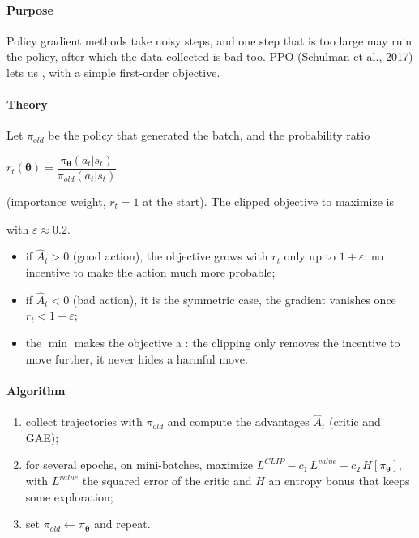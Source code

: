 \paragraph{Purpose}
Policy gradient methods take noisy steps, and one step that is too large may ruin the
policy, after which the data collected is bad too. PPO (Schulman et al., 2017) lets us
, with a simple first-order objective.

\paragraph{Theory}
Let $\pi_{old}$ be the policy that generated the batch, and the probability ratio
\begin{center}
    $r_{t}(\bm{\theta})=\dfrac{\pi_{\bm{\theta}}(a_{t}|s_{t})}{\pi_{old}(a_{t}|s_{t})}$
\end{center}
(importance weight, $r_{t}=1$ at the start). The clipped objective to maximize is
\begin{center}
    \frB{$L^{CLIP}(\bm{\theta})=\mathbb{E}_{t}\left[\min\left(r_{t}(\bm{\theta})\hat{A}_{t},\
    \mathrm{clip}\left(r_{t}(\bm{\theta}),1-\varepsilon,1+\varepsilon\right)\hat{A}_{t}
    \right)\right]$}
\end{center}
with $\varepsilon\approx0.2$.
\begin{itemize}
    \item if $\hat{A}_{t}>0$ (good action), the objective grows with $r_{t}$ only up to
        $1+\varepsilon$: no incentive to make the action much more probable;
    \item if $\hat{A}_{t}<0$ (bad action), it is the symmetric case, the gradient vanishes
        once $r_{t}<1-\varepsilon$;
    \item the $\min$ makes the objective a : the clipping only removes
        the incentive to move further, it never hides a harmful move.
\end{itemize}

\paragraph{Algorithm}
\begin{enumerate}
    \item collect trajectories with $\pi_{old}$ and compute the advantages $\hat{A}_{t}$
        (critic and GAE);
    \item for several epochs, on mini-batches, maximize
        $L^{CLIP}-c_{1}\,L^{value}+c_{2}\,H\left[\pi_{\bm{\theta}}\right]$, with
        $L^{value}$ the squared error of the critic and $H$ an entropy bonus that keeps
        some exploration;
    \item set $\pi_{old}\leftarrow\pi_{\bm{\theta}}$ and repeat.
\end{enumerate}

